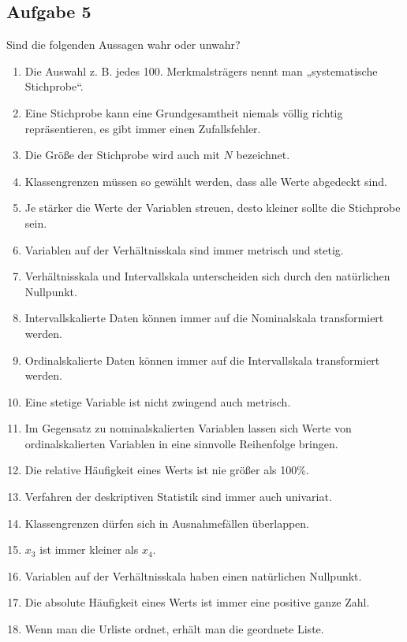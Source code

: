 \documentclass[
  11pt,
  ngerman,
  a4paper,
]{report}
\providecommand{\tightlist}{%
  \setlength{\itemsep}{0pt}\setlength{\parskip}{0pt}}
\begin{document}
\hypertarget{aufgabe-5}{%
\subsection{Aufgabe 5}\label{aufgabe-5}}

Sind die folgenden Aussagen wahr oder unwahr?

\begin{enumerate}
\def\labelenumi{\alph{enumi})}
\tightlist
\item
  Die Auswahl z. B. jedes 100. Merkmalsträgers nennt man „systematische Stichprobe``.
\item
  Eine Stichprobe kann eine Grundgesamtheit niemals völlig richtig repräsentieren, es gibt immer einen Zufallsfehler.
\item
  Die Größe der Stichprobe wird auch mit \(N\) bezeichnet.
\item
  Klassengrenzen müssen so gewählt werden, dass alle Werte abgedeckt sind.
\item
  Je stärker die Werte der Variablen streuen, desto kleiner sollte die Stichprobe sein.
\item
  Variablen auf der Verhältnisskala sind immer metrisch und stetig.
\item
  Verhältnisskala und Intervallskala unterscheiden sich durch den natürlichen Nullpunkt.
\item
  Intervallskalierte Daten können immer auf die Nominalskala transformiert werden.
\item
  Ordinalskalierte Daten können immer auf die Intervallskala transformiert werden.
\item
  Eine stetige Variable ist nicht zwingend auch metrisch.
\item
  Im Gegensatz zu nominalskalierten Variablen lassen sich Werte von ordinalskalierten Variablen in eine sinnvolle Reihenfolge bringen.
\item
  Die relative Häufigkeit eines Werts ist nie größer als 100\%.
\item
  Verfahren der deskriptiven Statistik sind immer auch univariat.
\item
  Klassengrenzen dürfen sich in Ausnahmefällen überlappen.
\item
  \(x_3\) ist immer kleiner als \(x_4\).
\item
  Variablen auf der Verhältnisskala haben einen natürlichen Nullpunkt.
\item
  Die absolute Häufigkeit eines Werts ist immer eine positive ganze Zahl.
\item
  Wenn man die Urliste ordnet, erhält man die geordnete Liste.
\end{enumerate}
\end{document}
